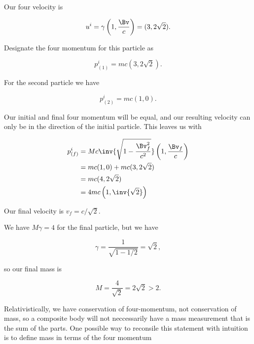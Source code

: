 Our four velocity is

\begin{equation}\label{eqn:relElectroDynProblemSet2:50}
u^i
= \gamma \left( 1, \frac{\Bv}{c} \right) = ( 3, 2 \sqrt{2} ).
\end{equation}

Designate the four momentum for this particle as

\begin{equation}\label{eqn:relElectroDynProblemSet2:70}
p_{(1)}^i = m c ( 3, 2 \sqrt{2} ).
\end{equation}

For the second particle we have

\begin{equation}\label{eqn:relElectroDynProblemSet2:90}
p_{(2)}^i = m c ( 1, 0 ).
\end{equation}

Our initial and final four momentum will be equal, and our resulting velocity can only be in the direction of the initial particle.  This leaves us with

\begin{align*}
p_{(f)}^i
&= M c \inv{\sqrt{1 - \frac{\Bv_f^2}{c^2}}} \left( 1, \frac{\Bv_f}{c} \right) \\
&= m c ( 1, 0 ) + m c ( 3, 2 \sqrt{2} )  \\
&= m c ( 4, 2 \sqrt{2} ) \\
&= 4 m c \left( 1, \inv{\sqrt{2}} \right)
\end{align*}

Our final velocity is $v_f = c/\sqrt{2}$.

We have $M \gamma = 4$ for the final particle, but we have

\begin{equation}\label{eqn:relElectroDynProblemSet2:110}
\gamma = \frac{1}{\sqrt{1 - 1/2}} = \sqrt{2},
\end{equation}

so our final mass is

\begin{equation}\label{eqn:relElectroDynProblemSet2:130}
M = \frac{4}{\sqrt{2}} = 2 \sqrt{2} > 2.
\end{equation}

Relativistically, we have conservation of four-momentum, not conservation of mass, so a composite body will not neccessarily have a mass measurement that is the sum of the parts.  One possible way to reconsile this statement with intuition is to define mass in terms of the four momentum

